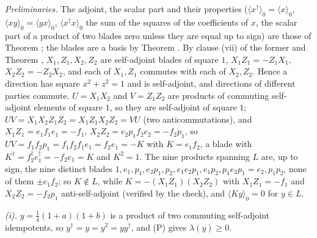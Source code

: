 \emph{Preliminaries.} The adjoint, the scalar part and their properties ($\langle x^{\dagger}\rangle_{0} = \langle x\rangle_{0}$, $\langle xy\rangle_{0} = \langle yx\rangle_{0}$, $\langle x^{\dagger}x\rangle_{0}$ the sum of the squares of the coefficients of $x$, the scalar part of a product of two blades zero unless they are equal up to sign) are those of Theorem ; the blades are a basis by Theorem . By clause (vii) of the former and Theorem , $X_{1}, Z_{1}, X_{2}, Z_{2}$ are self-adjoint blades of square $1$, $X_{1}Z_{1} = -Z_{1}X_{1}$, $X_{2}Z_{2} = -Z_{2}X_{2}$, and each of $X_{1}, Z_{1}$ commutes with each of $X_{2}, Z_{2}$. Hence a direction has square $x^{2} + z^{2} = 1$ and is self-adjoint, and directions of different parties commute. $U = X_{1}X_{2}$ and $V = Z_{1}Z_{2}$ are products of commuting self-adjoint elements of square $1$, so they are self-adjoint of square $1$; $UV = X_{1}X_{2}Z_{1}Z_{2} = X_{1}Z_{1}X_{2}Z_{2} = VU$ (two anticommutations), and $X_{1}Z_{1} = e_{1}f_{1}e_{1} = -f_{1}$, $X_{2}Z_{2} = e_{2}p_{1}f_{2}e_{2} = -f_{2}p_{1}$, so $UV = f_{1}f_{2}p_{1} = f_{1}f_{2}f_{1}e_{1} = f_{2}e_{1} = -K$ with $K = e_{1}f_{2}$, a blade with $K^{\dagger} = f_{2}^{\dagger}e_{1}^{\dagger} = -f_{2}e_{1} = K$ and $K^{2} = 1$. The nine products spanning $L$ are, up to sign, the nine distinct blades $1, e_{1}, p_{1}, e_{2}p_{1}, p_{2}, e_{1}e_{2}p_{1}, e_{1}p_{2}, p_{1}e_{2}p_{1} = e_{2}, p_{1}p_{2}$, none of them $\pm e_{1}f_{2}$; so $K \notin L$, while $K = -(X_{1}Z_{1})(X_{2}Z_{2})$ with $X_{1}Z_{1} = -f_{1}$ and $X_{2}Z_{2} = -f_{2}p_{1}$ anti-self-adjoint (verified by the check), and $\langle Ky\rangle_{0} = 0$ for $y \in L$.

\emph{(i).} $y = \tfrac14(1 + a)(1 + b)$ is a product of two commuting self-adjoint idempotents, so $y^{\dagger} = y = y^{2} = yy^{\dagger}$, and (P) gives $\lambda(y) \ge 0$.

